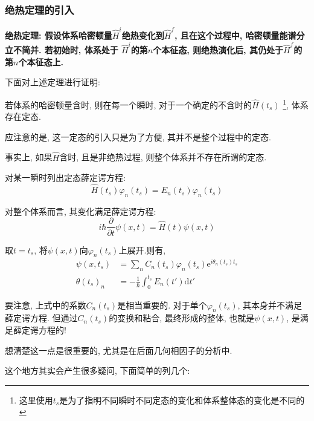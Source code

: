 \documentclass[a4paper, 11pt]{article}
\begin{document}
\begin{spacing}{1.2}
      \subsubsection{绝热定理的引入}
        \textbf{
        绝热定理: 假设体系哈密顿量$\hat{H}^i$绝热变化到$\hat{H}^f$, 且在这个过程中, 哈密顿量能谱分立不简并. 若初始时, 体系处于
        $\hat{H}^i$的第$n$个本征态, 则绝热演化后, 其仍处于$\hat{H}^f$的第$n$个本征态上.}
        \par
        下面对上述定理进行证明:
        \par
        若体系的哈密顿量含时, 则在每一个瞬时, 对于一个确定的不含时的$\hat{H}(t_s)$
        \footnote{这里使用$t_s$是为了指明不同瞬时不同定态的变化和体系整体态的变化是不同的}, 
        体系存在定态.
        \par
        应注意的是, 这一定态的引入只是为了方便, 其并不是整个过程中的定态.
        \par
        事实上, 如果$\hat{H}$含时, 且是非绝热过程, 则整个体系并不存在所谓的定态.
        \par
        对某一瞬时列出定态薛定谔方程:
        \begin{equation}
          \hat{H}(t_s)\varphi_n(t_s) = E_n(t_s)\varphi_n(t_s)
        \end{equation}
        
        对整个体系而言, 其变化满足薛定谔方程:     
        \begin{equation}
          i\hbar\dfrac{\partial}{\partial{}t}\psi(x, t) = \hat{H}(t)\psi(x, t)
        \end{equation}
      
        取$t = t_s$, 将$\psi(x, t)$向$\varphi_n(t_s)$上展开.则有,
        \begin{equation}
          \label{origin_out}
          \begin{aligned}
            \psi(x, t_s) &= \sum_nC_n(t_s)\varphi_n(t_s)\mathrm{e}^{i\theta_n(t_s)t_s}\\
            \theta(t_s)_n &= -\frac{1}{\hbar}\int_0^{t_s}E_n(t')\mathrm{d}t'
          \end{aligned}
        \end{equation}

        要注意, 上式中的系数$C_n(t_s)$是相当重要的. 对于单个$\varphi_n(t_s)$, 其本身并不满足薛定谔方程. 
        但通过$C_n(t_s)$的变换和粘合, 最终形成的整体, 也就是$\psi(x, t)$, 是满足薛定谔方程的!
        \par
        想清楚这一点是很重要的, 尤其是在后面几何相因子的分析中.
        \par 
        这个地方其实会产生很多疑问, 下面简单的列几个:
        \par


\end{spacing}
\end{document}
